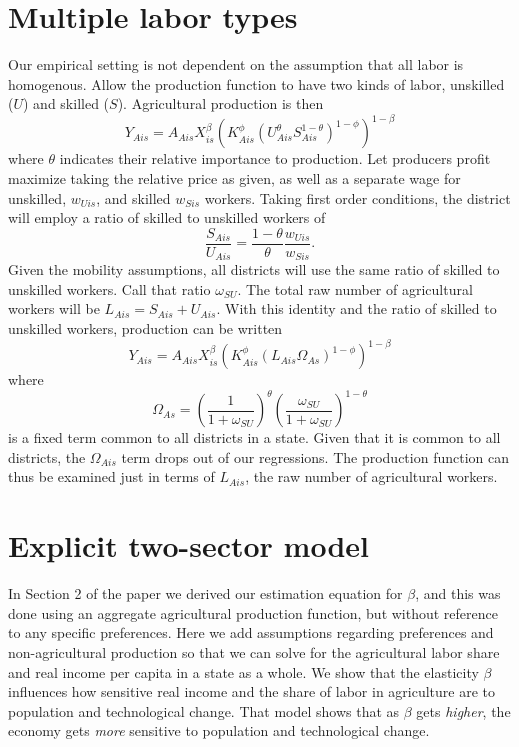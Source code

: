 \documentclass[11pt]{article}
\begin{document}
\section{Multiple labor types}
Our empirical setting is not dependent on the assumption that all labor is homogenous. Allow the production function to have two kinds of labor, unskilled ($U$) and skilled ($S$). Agricultural production is then
\begin{equation}
Y_{Ais} = A_{Ais} X_{is}^{\beta} \left(K_{Ais}^{\phi}(U_{Ais}^{\theta}S_{Ais}^{1-\theta})^{1-\phi}\right)^{1-\beta} 
\end{equation}
where $\theta$ indicates their relative importance to production. Let producers profit maximize taking the relative price as given, as well as a separate wage for unskilled, $w_{Uis}$, and skilled $w_{Sis}$ workers. Taking first order conditions, the district will employ a ratio of skilled to unskilled workers of
\begin{equation}
    \frac{S_{Ais}}{U_{Ais}} = \frac{1-\theta}{\theta}\frac{w_{Uis}}{w_{Sis}}.
\end{equation}
Given the mobility assumptions, all districts will use the same ratio of skilled to unskilled workers. Call that ratio $\omega_{SU}$. The total raw number of agricultural workers will be $L_{Ais} = S_{Ais} + U_{Ais}$. With this identity and the ratio of skilled to unskilled workers, production can be written
\begin{equation}
    Y_{Ais} = A_{Ais} X_{is}^{\beta} \left(K_{Ais}^{\phi}(L_{Ais}\Omega_{As})^{1-\phi}\right)^{1-\beta} 
\end{equation}
where
\begin{equation}
    \Omega_{As} = \left(\frac{1}{1+\omega_{SU}} \right)^{\theta} \left(\frac{\omega_{SU}}{1+\omega_{SU}} \right)^{1-\theta}
\end{equation}
is a fixed term common to all districts in a state. Given that it is common to all districts, the $\Omega_{Ais}$ term drops out of our regressions. The production function can thus be examined just in terms of $L_{Ais}$, the raw number of agricultural workers.

\section{Explicit two-sector model}\label{APP_solve}
In Section 2 of the paper we derived our estimation equation for $\beta$, and this was done using an aggregate agricultural production function, but without reference to any specific preferences. Here we add assumptions regarding preferences and non-agricultural production so that we can solve for the agricultural labor share and real income per capita in a state as a whole. We show that the elasticity $\beta$ influences how sensitive real income and the share of labor in agriculture are to population and technological change. That model shows that as $\beta$ gets \textit{higher}, the economy gets \textit{more} sensitive to population and technological change.
\end{document}
